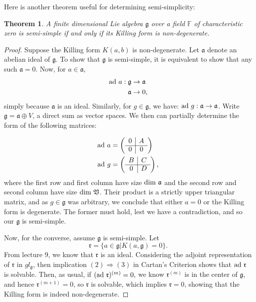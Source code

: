\documentclass{amsart}
\newtheorem*{Theorem}{Theorem}
\newcommand*{\g}{\mathfrak{g}}
\begin{document}
Here is another theorem useful for determining semi-simplicity:

\begin{Theorem}
A finite dimensional Lie algebra $\g$ over a field $\mathbb{F}$ of
characteristic zero is semi-simple if and only if its Killing form is non-degenerate.
\end{Theorem}

\begin{proof}
Suppose the Killing form $K(a,b)$ is non-degenerate.  Let
$\mathfrak{a}$ denote an abelian ideal of $\g$.  To show that $\g$ is
semi-simple, it is equivalent to show that any such $\mathfrak{a} =
0$.  Now, for $a \in \mathfrak{a}$,
\begin{align*}
\textnormal{ad }a: \g & \rightarrow \mathfrak{a} \\
\mathfrak{a} & \rightarrow 0,
\end{align*}
simply because $\mathfrak{a}$ is an ideal.  Similarly, for $g \in \g$,
we have:  $\textnormal{ad }g: \mathfrak{a} \rightarrow
\mathfrak{a}$.  Write $\g = \mathfrak{a} \oplus V$, a direct sum as
vector spaces.  We then can partially determine the form of 
the following matrices:

\begin{align*}
\textnormal{ad }a & = \left( \begin{array}{c|c}
0 & A \\ \cline{1-2} 
0 & 0 
\end{array}\right)\\
\textnormal{ad }g & = \left( \begin{array}{c|c}
B & C \\ \cline{1-2} 
0 & D 
\end{array}\right),
\end{align*}
\noindent
where the first row and first column have size $\textnormal{dim }
\mathfrak{a}$ and the second row and second column have size $\textnormal{dim }
\mathfrak{V}$.  Their product is a strictly upper triangular matrix,
and as $g \in \g$ was arbitrary, we conclude that either $a = 0$ or
the Killing form is degenerate.  The former must hold, lest we have a
contradiction, and so our $\g$ is semi-simple.

Now, for the converse, assume $\g$ is semi-simple.  Let $$\mathfrak{r} = \{ a \in
\g | K(a,\g) = 0 \}.$$  From lecture $9$, we know that $\mathfrak{r}$ is an
ideal.  Considering the adjoint representation of $\mathfrak{r}$ in $gl_{\g}$,
then implication $(2) \Rightarrow (3)$ in Cartan's Criterion shows
that $\textnormal{ad }\mathfrak{r}$ is solvable.  Then, as usual,
if $(\textnormal{ad }\mathfrak{r})^{(m)} = 0,$ we know
$\mathfrak{r}^{(m)}$ is in the center of $\g$, and hence
$\mathfrak{r}^{(m+1)}=0$, so $\mathfrak{r}$ is solvable, which implies
$\mathfrak{r} = 0$, showing that the Killing form is indeed non-degenerate.

\end{proof}
\end{document}
